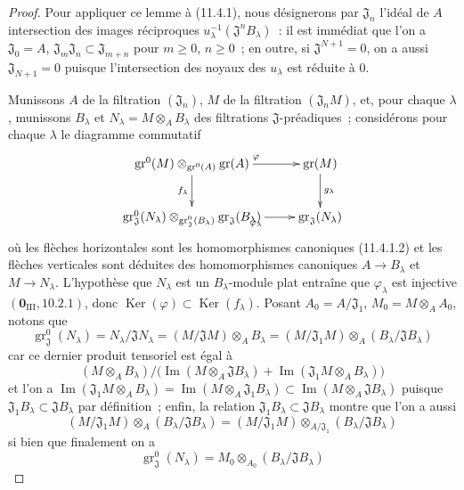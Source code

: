 \begin{proof}
Pour appliquer ce lemme à (11.4.1), nous désignerons par $\mathfrak J_n$
l'idéal de $A$ intersection des images réciproques
$u_\lambda^{-1}(\mathfrak J^nB_\lambda)$~: il est immédiat que l'on a
$\mathfrak J_0=A$, $\mathfrak J_m\mathfrak J_n\subset\mathfrak J_{m+n}$ pour
$m\geq0$, $n\geq0$~; en outre, si $\mathfrak J^{N+1}=0$, on a aussi
$\mathfrak J_{N+1}=0$ puisque l'intersection des noyaux des $u_\lambda$ est
réduite à $0$.

Munissons $A$ de la filtration $(\mathfrak J_n)$, $M$ de la filtration
$(\mathfrak J_nM)$, et, pour chaque $\lambda$, munissons $B_\lambda$ et
$N_\lambda=M\otimes_A B_\lambda$ des filtrations $\mathfrak J$-préadiques~;
considérons pour chaque $\lambda$ le diagramme commutatif
\[
\xymatrix{
\operatorname{gr}^0(M)\otimes_{\operatorname{gr}^0(A)}\operatorname{gr}(A)
 \ar[r]^{\varphi} \ar[d]_{f_\lambda} & \operatorname{gr}(M) \ar[d]^{g_\lambda} \\
\operatorname{gr}_{\mathfrak J}^0(N_\lambda)
 \otimes_{\operatorname{gr}_{\mathfrak J}^0(B_\lambda)}
 \operatorname{gr}_{\mathfrak J}(B_\lambda)
 \ar[r]_{\varphi_\lambda} & \operatorname{gr}_{\mathfrak J}(N_\lambda)
}
\]
où les flèches horizontales sont les homomorphismes canoniques (11.4.1.2) et
les flèches verticales sont déduites des homomorphismes canoniques
$A\to B_\lambda$ et $M\to N_\lambda$. L'hypothèse que $N_\lambda$ est un
$B_\lambda$-module plat entraîne que $\varphi_\lambda$ est injective
$(\mathbf 0_{\mathrm{III}},10.2.1)$, donc
$\operatorname{Ker}(\varphi)\subset\operatorname{Ker}(f_\lambda)$. Posant
$A_0=A/\mathfrak J_1$, $M_0=M\otimes_A A_0$, notons que
\[
\operatorname{gr}_{\mathfrak J}^0(N_\lambda)
=N_\lambda/\mathfrak JN_\lambda
=(M/\mathfrak JM)\otimes_A B_\lambda
=(M/\mathfrak J_1M)\otimes_A(B_\lambda/\mathfrak JB_\lambda)
\]
car ce dernier produit tensoriel est égal à
\[
(M\otimes_A B_\lambda)\Big/
\big(\operatorname{Im}(M\otimes_A\mathfrak JB_\lambda)
 +\operatorname{Im}(\mathfrak J_1M\otimes_A B_\lambda)\big)
\]
et l'on a
$\operatorname{Im}(\mathfrak J_1M\otimes_A B_\lambda)
=\operatorname{Im}(M\otimes_A\mathfrak J_1B_\lambda)
\subset\operatorname{Im}(M\otimes_A\mathfrak JB_\lambda)$ puisque
$\mathfrak J_1B_\lambda\subset\mathfrak JB_\lambda$ par définition~; enfin,
la relation $\mathfrak J_1B_\lambda\subset\mathfrak JB_\lambda$ montre que l'on
a aussi
\[
(M/\mathfrak J_1M)\otimes_A(B_\lambda/\mathfrak JB_\lambda)
=(M/\mathfrak J_1M)\otimes_{A/\mathfrak J_1}
 (B_\lambda/\mathfrak JB_\lambda)
\]
si bien que finalement on a
\[
\operatorname{gr}_{\mathfrak J}^0(N_\lambda)
=M_0\otimes_{A_0}(B_\lambda/\mathfrak JB_\lambda)
\]
\end{proof}
